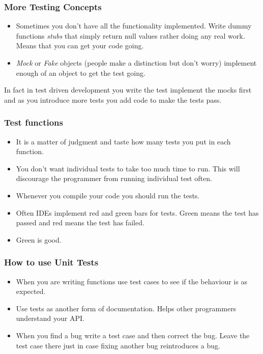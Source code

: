\documentclass{beamer}
\begin{document}
\begin{frame}
  \frametitle{More Testing Concepts}
  \begin{itemize}
  \item Sometimes you don't have all the functionality
    implemented. Write dummy functions {\em stubs} that simply return
    null values rather doing any real work. Means that you can get
    your code going.
\item {\em Mock}  or {\em Fake} objects (people make a distinction but don't worry)
  implement enough of an object to get the test going.
  \end{itemize}
In fact in test driven development you write the test implement the
mocks first and as you introduce more tests you add code to make the
tests pass.

\end{frame}
\begin{frame}
  \frametitle{Test functions}
  \begin{itemize}
  \item It is a matter of judgment and taste how many tests you put in
    each function.
  \item  You don't want individual tests  to take too much time to
    run. This will discourage the programmer from running individual
    test often.
  \item Whenever you compile your code you should run the tests. 
  \item Often IDEs implement red and green bars for tests. Green means
    the test has passed and red means the test has failed.
  \item Green is good. 
  \end{itemize}
\end{frame}
\begin{frame}
  \frametitle{How to use Unit Tests}
  \begin{itemize}
  \item When you are writing functions use test cases to see if the
    behaviour is as expected.
  \item Use tests as another form of documentation. Helps other
    programmers understand your API.
  \item When you find a bug write a test case and then correct the
    bug. Leave the test case there just in case fixing another bug
    reintroduces a bug.
  \end{itemize}
\end{frame}
\end{document}
